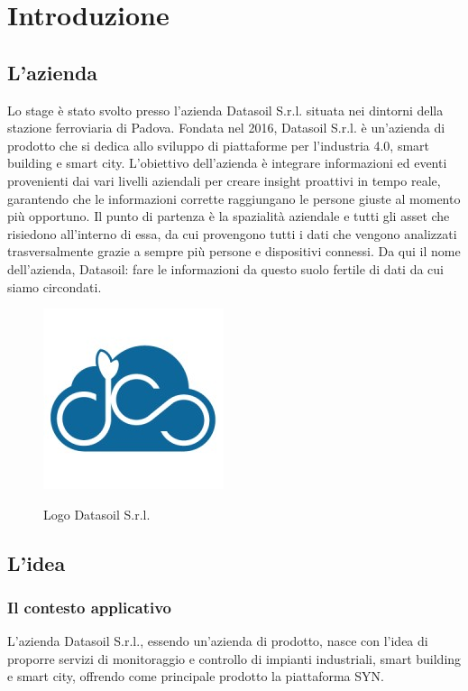 \chapter{Introduzione}
\label{chap:introduzione}

\section{L'azienda}
Lo stage è stato svolto presso l'azienda Datasoil S.r.l. situata nei dintorni della stazione ferroviaria di Padova.
Fondata nel 2016, Datasoil S.r.l. è un'azienda di prodotto che si dedica allo sviluppo di piattaforme per l'industria 4.0,
smart building e smart city.
L'obiettivo dell'azienda è integrare informazioni ed eventi provenienti dai vari livelli aziendali per creare insight proattivi
in tempo reale, garantendo che le informazioni corrette raggiungano le persone giuste al momento più opportuno.
Il punto di partenza è la spazialità aziendale e tutti gli asset che risiedono all'interno di essa, da cui
provengono tutti i dati che vengono analizzati trasversalmente grazie a sempre più persone e dispositivi connessi.
Da qui il nome dell'azienda, Datasoil: fare le informazioni da questo suolo fertile di dati da cui siamo circondati.

\begin{figure}[H]
      \centering
      \includegraphics[alt={Logo Datasoil S.r.l.}, width=0.25\columnwidth]{img/datasoil_logo.jpg}
      \caption{Logo Datasoil S.r.l.}
      \label{fig:datasoil}
\end{figure}

\section{L'idea}
\subsection{Il contesto applicativo}
L'azienda Datasoil S.r.l., essendo un'azienda di prodotto, nasce con l'idea di proporre servizi di monitoraggio e controllo
di impianti industriali, smart building e smart city, offrendo come principale prodotto la piattaforma SYN.

